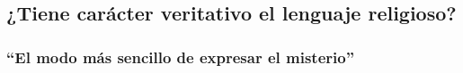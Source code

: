 \subsection{¿Tiene carácter veritativo el lenguaje religioso?}

\subsubsection{``El modo más sencillo de expresar el misterio''}
